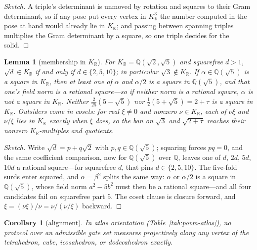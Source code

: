 \documentclass[11pt, oneside, openany]{scrbook}
\newcommand{\R}{\mathbb{R}}
\newcommand{\phig}{\tau} %
\newtheorem{lemma}[theorem]{Lemma}
\newtheorem{corollary}[theorem]{Corollary}
\newenvironment{sketch}{\renewcommand{\qedsymbol}{}\begin{proof}[Sketch]}{\end{proof}}
\begin{document}
\begin{sketch}
A triple's determinant is unmoved by rotation and squares to their Gram determinant, so if any pose put every vertex in $K_\R^3$ the number computed in the pose at hand would already lie in $K_\R$; and passing between spanning triples multiplies the Gram determinant by a square, so one triple decides for the solid.
\end{sketch}

\begin{lemma}[membership in $K_\R$] \label{lem:membership}
For $K_\R = \mathbb{Q}(\sqrt{2},\sqrt{5})$ and squarefree $d > 1$, $\sqrt{d} \in K_\R$ if and only if $d \in \{2,5,10\}$; in particular $\sqrt{3} \notin K_\R$. If $\alpha \in \mathbb{Q}(\sqrt{5})$ is a square in $K_\R$, then at least one of $\alpha$ and $\alpha/2$ is a square in $\mathbb{Q}(\sqrt{5})$, and that one's field norm is a rational square---so if neither norm is a rational square, $\alpha$ is not a square in $K_\R$. Neither $\tfrac{2}{25}(5-\sqrt{5})$ nor $\tfrac{1}{2}(5+\sqrt{5}) = 2 + \phig$ is a square in $K_\R$. Outsiders come in cosets: for real $\xi \neq 0$ and nonzero $\nu \in K_\R$, each of $\nu\xi$ and $\nu/\xi$ lies in $K_\R$ exactly when $\xi$ does, so the ban on $\sqrt{3}$ and $\sqrt{2+\phig}$ reaches their nonzero $K_\R$-multiples and quotients.
\end{lemma}

\begin{sketch}
Write $\sqrt{d} = p + q\sqrt{2}$ with $p, q \in \mathbb{Q}(\sqrt{5})$; squaring forces $pq = 0$, and the same coefficient comparison, now for $\mathbb{Q}(\sqrt{5})$ over $\mathbb{Q}$, leaves one of $d$, $2d$, $5d$, $10d$ a rational square---for squarefree $d$, that pins $d \in \{2, 5, 10\}$. The five-fold surds enter squared, and $\alpha = \beta^2$ splits the same way: $\alpha$ or $\alpha/2$ is a square in $\mathbb{Q}(\sqrt{5})$, whose field norm $a^2 - 5b^2$ must then be a rational square---and all four candidates fail on squarefree part $5$. The coset clause is closure forward, and $\xi = (\nu\xi)/\nu = \nu/(\nu/\xi)$ backward.
\end{sketch}



\begin{corollary}[alignment] \label{cor:alignment}
In atlas orientation (Table~\ref{tab:povm-atlas}), no protocol over an admissible gate set measures projectively along any vertex of the tetrahedron, cube, icosahedron, or dodecahedron exactly.
\end{corollary}
\end{document}
